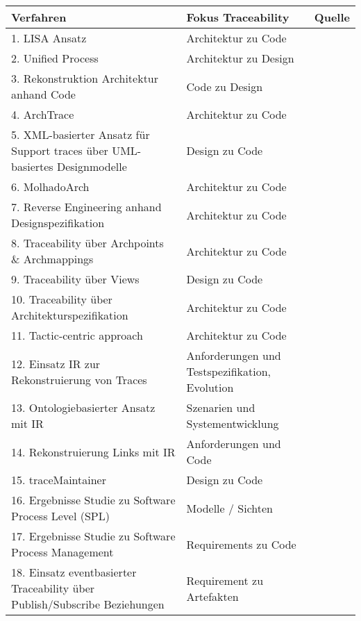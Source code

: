 \begin{table}[htbp]
\renewcommand{\arraystretch}{1.3}
\centering
\begin{threeparttable}
\begin{tabularx}{\columnwidth}{@{}XXl@{}}
\toprule
Verfahren & Fokus Traceability & Quelle  \\ \midrule
1. LISA Ansatz & Architektur zu Code & \cite{Javed2014ACode} \\
2. Unified Process & Architektur zu Design & \cite{Javed2014ACode} \\
3. Rekonstruktion Architektur anhand Code & Code zu Design & \cite{Javed2014ACode} \\
4. ArchTrace & Architektur zu Code & \cite{Javed2014ACode} \\
5. XML-basierter Ansatz für Support traces über UML-basiertes Designmodelle & Design zu Code & \cite{Javed2014ACode} \\
6. MolhadoArch & Architektur zu Code & \cite{Javed2014ACode} \\
7. Reverse Engineering anhand Designspezifikation & Architektur zu Code & \cite{Javed2014ACode} \\
8. Traceability über Archpoints \& Archmappings & Architektur zu Code & \cite{Javed2014ACode} \\
9. Traceability über Views & Design zu Code & \cite{Javed2014ACode} \\
10. Traceability über Architekturspezifikation & Architektur zu Code & \cite{Javed2014ACode} \\
11. Tactic-centric approach & Architektur zu Code & \cite{Javed2014ACode} \\
12. Einsatz IR zur Rekonstruierung von Traces & Anforderungen und Testspezifikation, Evolution & \cite{Leuser2010TacklingSpecifications, Merten2016DoData} \\
13. Ontologiebasierter Ansatz mit IR & Szenarien und Systementwicklung & \cite{Saputri2016EnsuringApproach} \\
14. Rekonstruierung Links mit IR & Anforderungen und Code & \cite{Tsuchiya2013RecoveringProducts} \\
15. traceMaintainer & Design zu Code & \cite{Mader2009EnablingRelations} \\
16. Ergebnisse Studie zu Software Process Level (SPL) & Modelle / Sichten & \cite{Lago2009AManagement} \\
17. Ergebnisse Studie zu Software Process Management & Requirements zu Code & \cite{Lago2009AManagement} \\
18. Einsatz eventbasierter Traceability über Publish/Subscribe Beziehungen & Requirement zu Artefakten & \cite{Mder2012TowardsMaintenance} \\

\end{tabularx}
\end{threeparttable}
\end{table}

